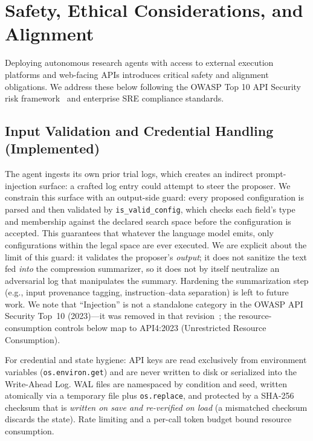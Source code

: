 \documentclass[conference]{IEEEtran}
\begin{document}
\section{Safety, Ethical Considerations, and Alignment}
\label{sec:safety}

Deploying autonomous research agents with access to external execution platforms and web-facing APIs introduces critical safety and alignment obligations. We address these below following the OWASP Top 10 API Security risk framework~\citep{owasp2023api} and enterprise SRE compliance standards.

\subsection{Input Validation and Credential Handling (Implemented)}
The agent ingests its own prior trial logs, which creates an indirect prompt-injection surface: a crafted log entry could attempt to steer the proposer. We constrain this surface with an output-side guard: every proposed configuration is parsed and then validated by \texttt{is\_valid\_config}, which checks each field's type and membership against the declared search space before the configuration is accepted. This guarantees that whatever the language model emits, only configurations within the legal space are ever executed. We are explicit about the limit of this guard: it validates the proposer's \emph{output}; it does not sanitize the text fed \emph{into} the compression summarizer, so it does not by itself neutralize an adversarial log that manipulates the summary. Hardening the summarization step (e.g., input provenance tagging, instruction--data separation) is left to future work. We note that ``Injection'' is not a standalone category in the OWASP API Security Top~10 (2023)---it was removed in that revision~\citep{owasp2023api}; the resource-consumption controls below map to API4:2023 (Unrestricted Resource Consumption).

For credential and state hygiene: API keys are read exclusively from environment variables (\texttt{os.environ.get}) and are never written to disk or serialized into the Write-Ahead Log. WAL files are namespaced by condition and seed, written atomically via a temporary file plus \texttt{os.replace}, and protected by a SHA-256 checksum that is \emph{written on save and re-verified on load} (a mismatched checksum discards the state). Rate limiting and a per-call token budget bound resource consumption.
\end{document}

